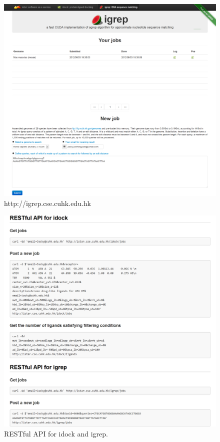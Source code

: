 \begin{figure}
\centering
\includegraphics[width=\linewidth]{istar/igrep.png}
\caption{http://igrep.cse.cuhk.edu.hk}
\label{istar:igrep}
\end{figure}

\begin{figure}
\centering
\includegraphics[width=\linewidth]{istar/RESTfulAPI.png}
\caption{RESTful API for idock and igrep.}
\label{istar:RESTfulAPI}
\end{figure}

